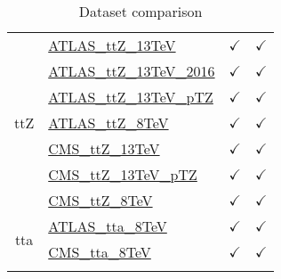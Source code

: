 \documentclass{article}
\begin{document}
\begin{longtable}{|c|l|c|c|}
\multirow{7}{*}{ttZ}
 & \href{https://arxiv.org}{ATLAS_ttZ_13TeV}  & $\checkmark$ & $\checkmark$\\ \cline{2-4}
 & \href{https://arxiv.org}{ATLAS_ttZ_13TeV_2016}  & $\checkmark$ & $\checkmark$\\ \cline{2-4}
 & \href{https://arxiv.org}{ATLAS_ttZ_13TeV_pTZ}  & $\checkmark$ & $\checkmark$\\ \cline{2-4}
 & \href{https://arxiv.org}{ATLAS_ttZ_8TeV}  & $\checkmark$ & $\checkmark$\\ \cline{2-4}
 & \href{https://arxiv.org}{CMS_ttZ_13TeV}  & $\checkmark$ & $\checkmark$\\ \cline{2-4}
 & \href{https://arxiv.org}{CMS_ttZ_13TeV_pTZ}  & $\checkmark$ & $\checkmark$\\ \cline{2-4}
 & \href{https://arxiv.org}{CMS_ttZ_8TeV}  & $\checkmark$ & $\checkmark$
\\ \hline
\multirow{2}{*}{tta}
 & \href{https://arxiv.org}{ATLAS_tta_8TeV}  & $\checkmark$ & $\checkmark$\\ \cline{2-4}
 & \href{https://arxiv.org}{CMS_tta_8TeV}  & $\checkmark$ & $\checkmark$
\\ \hline
\caption{Dataset comparison}
\end{longtable}
\end{document}

